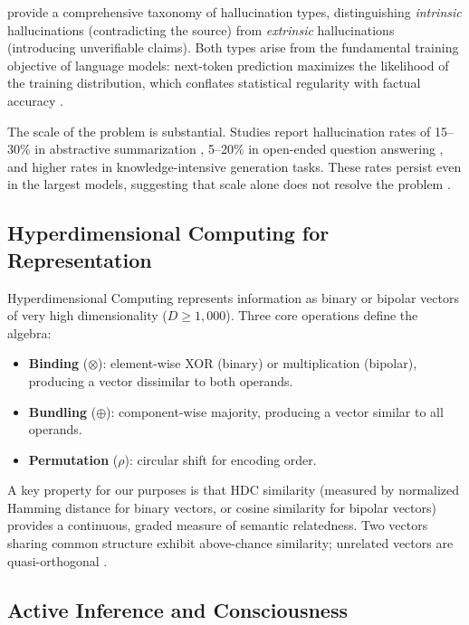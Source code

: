 \documentclass[12pt,a4paper]{article}
\begin{document}
\citet{ji2023survey} provide a comprehensive taxonomy of hallucination types, distinguishing \emph{intrinsic} hallucinations (contradicting the source) from \emph{extrinsic} hallucinations (introducing unverifiable claims). Both types arise from the fundamental training objective of language models: next-token prediction maximizes the likelihood of the training distribution, which conflates statistical regularity with factual accuracy \citep{bender2021dangers}.

The scale of the problem is substantial. Studies report hallucination rates of 15--30\% in abstractive summarization \citep{maynez2020faithfulness}, 5--20\% in open-ended question answering \citep{lin2022truthfulqa}, and higher rates in knowledge-intensive generation tasks. These rates persist even in the largest models, suggesting that scale alone does not resolve the problem \citep{ji2023survey}.

\subsection{Hyperdimensional Computing for Representation}

Hyperdimensional Computing \citep{kanerva2009hyperdimensional} represents information as binary or bipolar vectors of very high dimensionality ($D \geq 1{,}000$). Three core operations define the algebra:

\begin{itemize}
    \item \textbf{Binding} ($\otimes$): element-wise XOR (binary) or multiplication (bipolar), producing a vector dissimilar to both operands.
    \item \textbf{Bundling} ($\oplus$): component-wise majority, producing a vector similar to all operands.
    \item \textbf{Permutation} ($\rho$): circular shift for encoding order.
\end{itemize}

A key property for our purposes is that HDC similarity (measured by normalized Hamming distance for binary vectors, or cosine similarity for bipolar vectors) provides a continuous, graded measure of semantic relatedness. Two vectors sharing common structure exhibit above-chance similarity; unrelated vectors are quasi-orthogonal \citep{kanerva2009hyperdimensional}.

\subsection{Active Inference and Consciousness}
\end{document}
